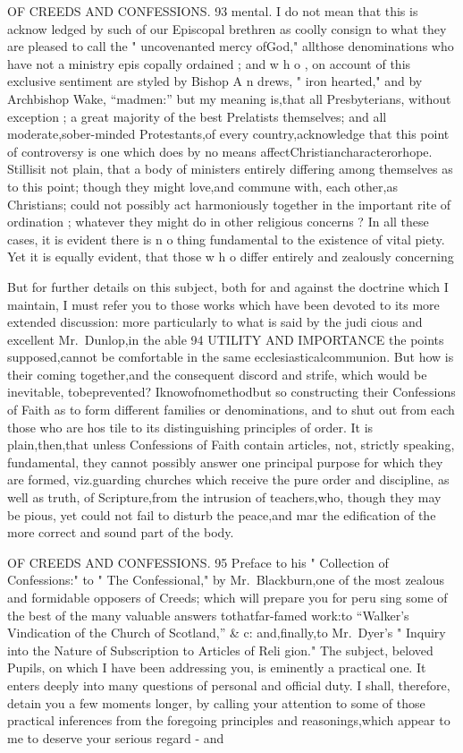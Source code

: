 \documentclass[
]{book}
\begin{document}
OF CREEDS AND CONFESSIONS. 93
mental. I do not mean that this is acknow
ledged by such of our Episcopal brethren as
coolly consign to what they are pleased to call
the " uncovenanted mercy ofGod," allthose denominations who have not a ministry epis
copally ordained ; and w h o , on account of this
exclusive sentiment are styled by Bishop A n
drews, " iron hearted," and by Archbishop
Wake, ``madmen:'' but my meaning is,that
all Presbyterians, without exception ; a great
majority of the best Prelatists themselves;
and all moderate,sober-minded Protestants,of
every country,acknowledge that this point of
controversy is one which does by no means affectChristiancharacterorhope. Stillisit
not plain, that a body of ministers entirely differing among themselves as to this point; though they might love,and commune with, each other,as Christians; could not possibly act harmoniously together in the important rite of ordination ; whatever they might do in other religious concerns ?
In all these cases, it is evident there is n o
thing fundamental to the existence of vital
piety. Yet it is equally evident, that those w h o differ entirely and zealously concerning

But for further details on this subject, both for and against the doctrine which I maintain, I must refer you to those works which have been devoted to its more extended discussion: more particularly to what is said by the judi cious and excellent Mr.~Dunlop,in the able
94 UTILITY AND IMPORTANCE
the points supposed,cannot be comfortable in the same ecclesiasticalcommunion. But how
is their coming together,and the consequent
discord and strife, which would be inevitable, tobeprevented? Iknowofnomethodbut so constructing their Confessions of Faith as to form different families or denominations, and to shut out from each those who are hos
tile to its distinguishing principles of order. It is plain,then,that unless Confessions of Faith contain articles, not, strictly speaking,
fundamental, they cannot possibly answer one principal purpose for which they are formed,
viz.guarding churches which receive the pure order and discipline, as well as truth, of Scripture,from the intrusion of teachers,who, though they may be pious, yet could not fail to disturb the peace,and mar the edification of the more correct and sound part of the body.

OF CREEDS AND CONFESSIONS. 95
Preface to his " Collection of Confessions:" to
" The Confessional," by Mr.~Blackburn,one of the most zealous and formidable opposers
of Creeds; which will prepare you for peru sing some of the best of the many valuable answers tothatfar-famed work:to ``Walker's Vindication of the Church of Scotland,'' \& c: and,finally,to Mr.~Dyer's " Inquiry into the Nature of Subscription to Articles of Reli
gion."
The subject, beloved Pupils, on which I have been addressing you, is eminently a practical one. It enters deeply into many questions of personal and official duty. I shall, therefore, detain you a few moments longer, by calling your attention to some of those practical inferences from the foregoing principles and reasonings,which appear to me to deserve your serious regard - and
\end{document}
